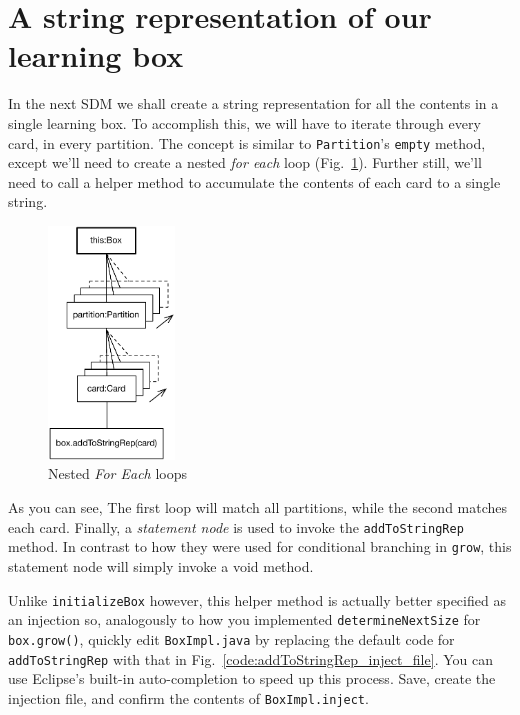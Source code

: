 \newpage
\hypertarget{sec:stringRep}{}
\section{A string representation of our learning box}
\label{sec_A string representation of our learning box}
\genHeader

In the next SDM we shall create a string representation for all the contents in a single learning box. To accomplish this, we will have to iterate through 
every card, in every partition. The concept is similar to \texttt{Partition}'s \texttt{empty} method, except we'll need to create a nested \emph{for each}
loop (Fig.~\ref{fig:goal_stringRep}). Further still, we'll need to call a helper method to accumulate the contents of each card to a single string.

\vspace{1cm}

\begin{figure}[htbp]
	\centering
	\includegraphics[width=0.3\textwidth]{goal_stringRep.pdf}
	\caption{Nested \emph{For Each} loops}
	\label{fig:goal_stringRep}
\end{figure}

\vspace{1cm}

As you can see, The first loop will match all partitions, while the second matches each card. Finally, a \emph{statement node} is used to invoke the
\texttt{addToStringRep} method. In contrast to how they were used for conditional branching in \texttt{grow}, this statement node will simply invoke a
void method.

Unlike \texttt{initializeBox} however, this helper method is actually better specified as an injection so, analogously to how you implemented
\texttt{deter\-mine\-Next\-Size} for \texttt{box.grow()}, quickly edit \texttt{BoxImpl.java} by replacing the default code for \texttt{addToStringRep} with that
in Fig.~\ref{code:addToStringRep_inject_file}. You can use Eclipse's built-in auto-completion to speed up this process. Save, create the injection file, and
confirm the contents of \texttt{BoxImpl.inject}.

